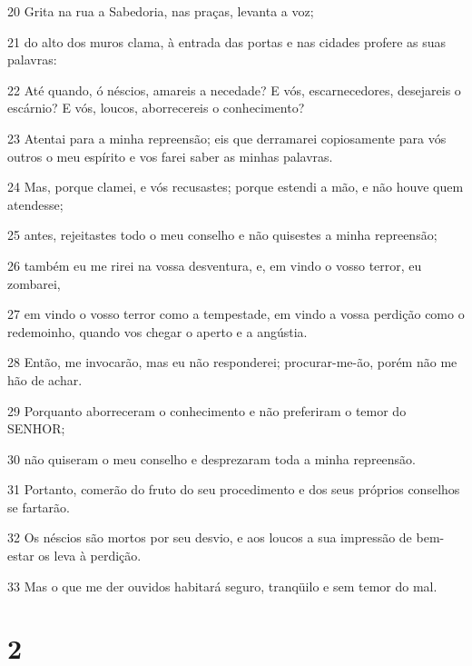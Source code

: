 \par 20 Grita na rua a Sabedoria, nas praças, levanta a voz;
\par 21 do alto dos muros clama, à entrada das portas e nas cidades profere as suas palavras:
\par 22 Até quando, ó néscios, amareis a necedade? E vós, escarnecedores, desejareis o escárnio? E vós, loucos, aborrecereis o conhecimento?
\par 23 Atentai para a minha repreensão; eis que derramarei copiosamente para vós outros o meu espírito e vos farei saber as minhas palavras.
\par 24 Mas, porque clamei, e vós recusastes; porque estendi a mão, e não houve quem atendesse;
\par 25 antes, rejeitastes todo o meu conselho e não quisestes a minha repreensão;
\par 26 também eu me rirei na vossa desventura, e, em vindo o vosso terror, eu zombarei,
\par 27 em vindo o vosso terror como a tempestade, em vindo a vossa perdição como o redemoinho, quando vos chegar o aperto e a angústia.
\par 28 Então, me invocarão, mas eu não responderei; procurar-me-ão, porém não me hão de achar.
\par 29 Porquanto aborreceram o conhecimento e não preferiram o temor do SENHOR;
\par 30 não quiseram o meu conselho e desprezaram toda a minha repreensão.
\par 31 Portanto, comerão do fruto do seu procedimento e dos seus próprios conselhos se fartarão.
\par 32 Os néscios são mortos por seu desvio, e aos loucos a sua impressão de bem-estar os leva à perdição.
\par 33 Mas o que me der ouvidos habitará seguro, tranqüilo e sem temor do mal.

\chapter{2}

